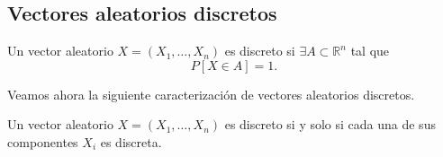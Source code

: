 \subsection{Vectores aleatorios discretos}
\begin{definicion}
    Un vector aleatorio $X=(X_1, \ldots, X_n)$ es discreto si $\exists A\subset \mathbb{R}^n$ tal que
    \begin{equation*}
        P[X\in A] = 1.
    \end{equation*}
\end{definicion}

Veamos ahora la siguiente caracterización de vectores aleatorios discretos.
\begin{teo}
    Un vector aleatorio $X=(X_1, \ldots, X_n)$ es discreto si y solo si cada una de sus componentes $X_i$ es discreta.
\end{teo}
